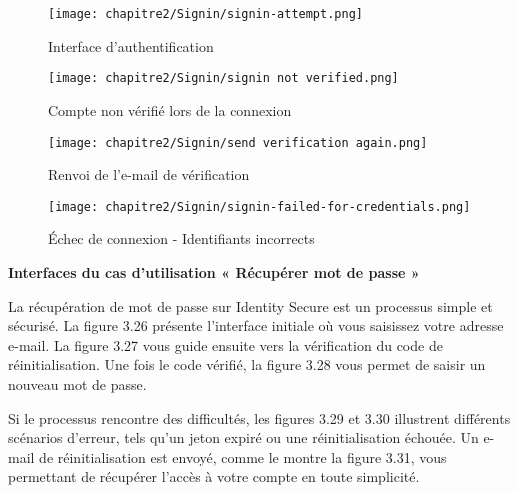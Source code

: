\begin{figure}[h!]
  \centering

  \begin{minipage}[t]{0.45\textwidth}
    \vspace*{0pt} %
    \centering
    \texttt{[image: chapitre2/Signin/signin-attempt.png]}
    \caption{Interface d'authentification}
  \end{minipage}%
  \hfill
  \begin{minipage}[t]{0.45\textwidth}
    \vspace*{0pt} %
    \centering
    \texttt{[image: chapitre2/Signin/signin not verified.png]}
    \caption{Compte non vérifié lors de la connexion}
  \end{minipage}
\end{figure}
\FloatBarrier
\clearpage
\begin{figure}[h!]
  \centering

  \begin{minipage}[t]{0.45\textwidth}
    \vspace*{0pt} %
    \centering
    \texttt{[image: chapitre2/Signin/send verification again.png]}
    \caption{Renvoi de l'e-mail de vérification}
  \end{minipage}%
  \hfill
  \begin{minipage}[t]{0.45\textwidth}
    \vspace*{0pt} %
    \centering
    \texttt{[image: chapitre2/Signin/signin-failed-for-credentials.png]}
    \caption{Échec de connexion - Identifiants incorrects}
  \end{minipage}
\end{figure}
\textbf{Interfaces du cas d'utilisation « Récupérer mot de passe »}

La récupération de mot de passe sur Identity Secure est un processus simple et sécurisé. La figure 3.26 présente l'interface initiale où vous saisissez votre adresse e-mail. La figure 3.27 vous guide ensuite vers la vérification du code de réinitialisation. Une fois le code vérifié, la figure 3.28 vous permet de saisir un nouveau mot de passe.

Si le processus rencontre des difficultés, les figures 3.29 et 3.30 illustrent différents scénarios d'erreur, tels qu'un jeton expiré ou une réinitialisation échouée. Un e-mail de réinitialisation est envoyé, comme le montre la figure 3.31, vous permettant de récupérer l'accès à votre compte en toute simplicité.

